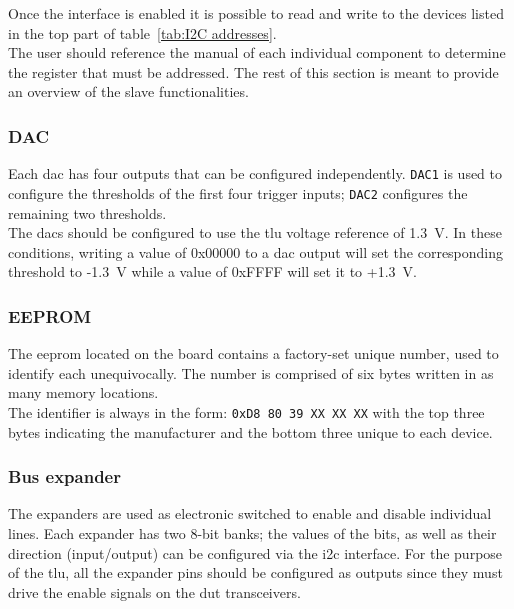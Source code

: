 Once the interface is enabled it is possible to read and write to the devices listed in the top part of table~\ref{tab:I2C addresses}.\\
The user should reference the manual of each individual component to determine the register that must be addressed. The rest of this section is meant to provide an overview of the slave functionalities.

\subsubsection{DAC}
Each \gls{dac} has four outputs that can be configured independently. \verb|DAC1| is used to configure the thresholds of the first four trigger inputs; \verb|DAC2| configures the remaining two thresholds.\\
The \gls{dac}s should be configured to use the \gls{tlu} voltage reference of 1.3~V. In these conditions, writing a value of 0x00000 to a \gls{dac} output will set the corresponding threshold to -1.3~V while a value of 0xFFFF will set it to +1.3~V.

\subsubsection{EEPROM}
The \gls{eeprom} located on the board contains a factory-set unique number, used to identify each \brd unequivocally. The number is comprised of six bytes written in as many memory locations.\\
The identifier is always in the form: \verb|0xD8 80 39 XX XX XX| with the top three bytes indicating the manufacturer and the bottom three unique to each device.

\subsubsection{Bus expander}
The expanders are used as electronic switched to enable and disable individual lines. Each expander has two 8-bit banks; the values of the bits, as well as their direction (input/output) can be configured via the \gls{i2c} interface. For the purpose of the \gls{tlu}, all the expander pins should be configured as outputs since they must drive the enable signals on the \gls{dut} transceivers.

